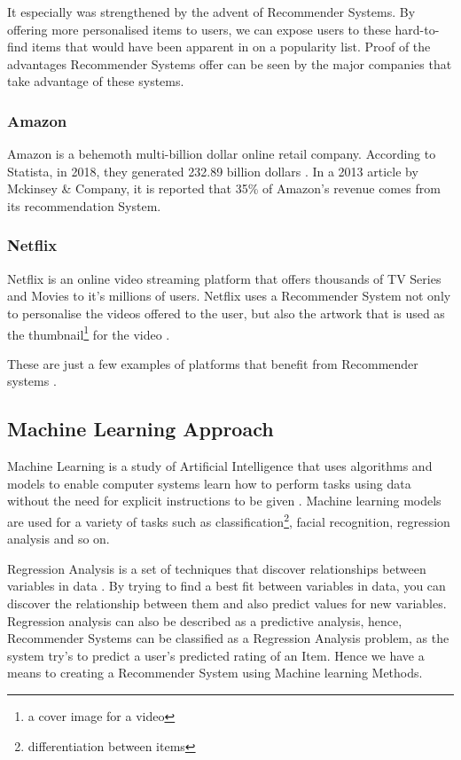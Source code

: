 It especially was strengthened by the advent of Recommender Systems. By offering more personalised items to users, we can expose users to these hard-to-find items that would have been apparent in on a popularity list. Proof of the advantages Recommender Systems offer can be seen by the major companies that take advantage of these systems.


\subsubsection{Amazon} 
Amazon is a behemoth multi-billion dollar online retail company. According to Statista, in 2018, they generated 232.89 billion dollars \cite{statista}. In a 2013 article by Mckinsey \& Company, it is reported that 35\% of Amazon's revenue comes from its recommendation System. 

\subsubsection{Netflix}
Netflix is an online video streaming platform that offers thousands of TV Series and Movies to it's millions of users. Netflix uses a Recommender System not only to personalise the videos offered to the user, but also the artwork that is used as the thumbnail\footnote{a cover image for a video} for the video \cite{josefina2018netflix}.

These are just a few examples of platforms that benefit from Recommender systems \cite{polatidis2013recommender}.

\subsection{Machine Learning Approach} \label{subsec:mlApproach}
Machine Learning is a study of Artificial Intelligence that uses algorithms and models to enable computer systems learn how to perform tasks using data without the need for explicit instructions to be given \cite{michie1994machine}. Machine learning models are used for a variety of tasks such as classification\footnote{differentiation between items}, facial recognition, regression analysis and so on.

Regression Analysis is a set of techniques that discover relationships between variables in data \cite{chatterjee2015regression}. By trying to find a best fit between variables in data, you can discover the relationship between them and also predict values for new variables. Regression analysis can also be described as a predictive analysis, hence, Recommender Systems can be classified as a Regression Analysis problem, as the system try's to predict a user's predicted rating of an Item. Hence we have a means to creating a Recommender System using Machine learning Methods.

